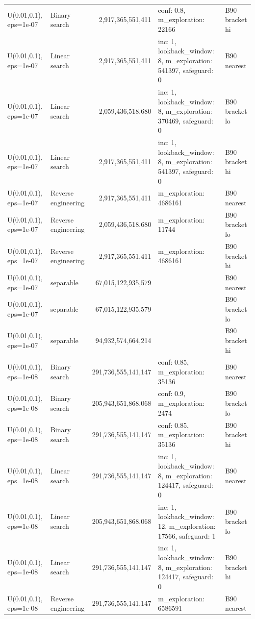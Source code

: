 \begin{tabular}{llrll}
U(0.01,0.1), eps=1e-07 & Binary search & 2,917,365,551,411 & conf: 0.8, m\_exploration: 22166 & B90 bracket hi \\
U(0.01,0.1), eps=1e-07 & Linear search & 2,917,365,551,411 & inc: 1, lookback\_window: 8, m\_exploration: 541397, safeguard: 0 & B90 nearest \\
U(0.01,0.1), eps=1e-07 & Linear search & 2,059,436,518,680 & inc: 1, lookback\_window: 8, m\_exploration: 370469, safeguard: 0 & B90 bracket lo \\
U(0.01,0.1), eps=1e-07 & Linear search & 2,917,365,551,411 & inc: 1, lookback\_window: 8, m\_exploration: 541397, safeguard: 0 & B90 bracket hi \\
U(0.01,0.1), eps=1e-07 & Reverse engineering & 2,917,365,551,411 & m\_exploration: 4686161 & B90 nearest \\
U(0.01,0.1), eps=1e-07 & Reverse engineering & 2,059,436,518,680 & m\_exploration: 11744 & B90 bracket lo \\
U(0.01,0.1), eps=1e-07 & Reverse engineering & 2,917,365,551,411 & m\_exploration: 4686161 & B90 bracket hi \\
U(0.01,0.1), eps=1e-07 & separable & 67,015,122,935,579 &  & B90 nearest \\
U(0.01,0.1), eps=1e-07 & separable & 67,015,122,935,579 &  & B90 bracket lo \\
U(0.01,0.1), eps=1e-07 & separable & 94,932,574,664,214 &  & B90 bracket hi \\
U(0.01,0.1), eps=1e-08 & Binary search & 291,736,555,141,147 & conf: 0.85, m\_exploration: 35136 & B90 nearest \\
U(0.01,0.1), eps=1e-08 & Binary search & 205,943,651,868,068 & conf: 0.9, m\_exploration: 2474 & B90 bracket lo \\
U(0.01,0.1), eps=1e-08 & Binary search & 291,736,555,141,147 & conf: 0.85, m\_exploration: 35136 & B90 bracket hi \\
U(0.01,0.1), eps=1e-08 & Linear search & 291,736,555,141,147 & inc: 1, lookback\_window: 8, m\_exploration: 124417, safeguard: 0 & B90 nearest \\
U(0.01,0.1), eps=1e-08 & Linear search & 205,943,651,868,068 & inc: 1, lookback\_window: 12, m\_exploration: 17566, safeguard: 1 & B90 bracket lo \\
U(0.01,0.1), eps=1e-08 & Linear search & 291,736,555,141,147 & inc: 1, lookback\_window: 8, m\_exploration: 124417, safeguard: 0 & B90 bracket hi \\
U(0.01,0.1), eps=1e-08 & Reverse engineering & 291,736,555,141,147 & m\_exploration: 6586591 & B90 nearest \\

\end{tabular}
